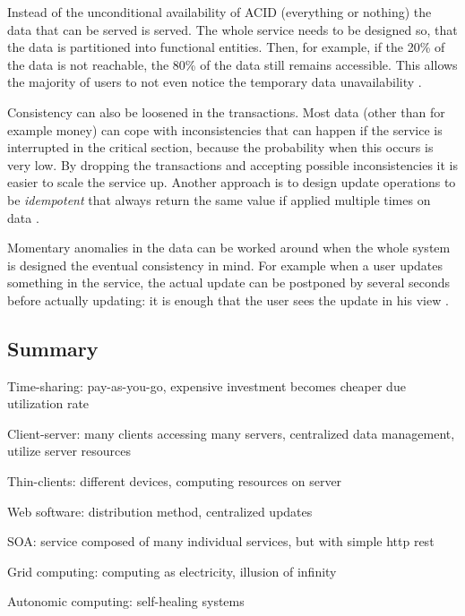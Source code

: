 \documentclass{tktltiki}
\begin{document}
Instead of the unconditional availability of ACID (everything or nothing) the data that can be served is served.  The whole service needs to be designed so, that the data is partitioned into functional entities.  Then, for example, if the 20\% of the data is not reachable, the 80\% of the data still remains accessible.  This allows the majority of users to not even notice the temporary data unavailability \cite{Pri08}.

Consistency can also be loosened in the transactions.  Most data (other than for example money) can cope with inconsistencies that can happen if the service is interrupted in the critical section, because the probability when this occurs is very low.  By dropping the transactions and accepting possible inconsistencies it is easier to scale the service up.  Another approach is to design update operations to be \emph{idempotent} that always return the same value if applied multiple times on data \cite{Pri08}.

Momentary anomalies in the data can be worked around when the whole system is designed the eventual consistency in mind.  For example when a user updates something in the service, the actual update can be postponed by several seconds before actually updating: it is enough that the user sees the update in his view \cite{Pri08}.



\subsection{Summary}

Time-sharing: pay-as-you-go, expensive investment becomes cheaper due utilization rate

Client-server: many clients accessing many servers, centralized data management, utilize server resources

Thin-clients: different devices, computing resources on server

Web software: distribution method, centralized updates

SOA: service composed of many individual services, but with simple http rest

Grid computing: computing as electricity, illusion of infinity

Autonomic computing: self-healing systems
\end{document}
